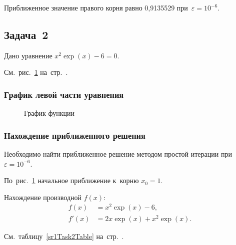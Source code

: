 \documentclass[10pt, a4paper, titlepage, oneside]{article}
\begin{document}
Приближенное значение правого корня равно 0,9135529 при~$\varepsilon=10^{-6}$.

\subsection{Задача~2}

Дано уравнение $x^2\exp(x)-6=0$.

См.~рис.~\ref{sr1Task2Function} на~стр.~\pageref{sr1Task2Function}.

\subsubsection*{График левой части уравнения}

\begin{figure}[htb]
    \centering
    \caption{График функции}
    \label{sr1Task2Function}
\end{figure}

\subsubsection*{Нахождение приближенного решения}

Необходимо найти приближенное решение методом простой итерации при~$\varepsilon=10^{-6}$.

По~рис.~\ref{sr1Task2Function} начальное приближение к~корню $x_0=1$.

Нахождение производной $f(x)$:
\begin{align*}
f(x) &= x^2\exp(x)-6, \\ 
f'(x) &= 2x\exp(x)+x^2\exp(x).
\end{align*}

См.~таблицу~\ref{sr1Task2Table} на~стр.~\pageref{sr1Task2Table}.
\end{document}

